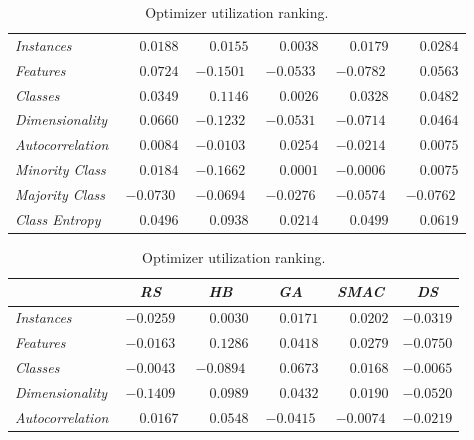 \begin{table}[ht]
\begin{subtable}{\textwidth}
\begin{tabular}{l|ccccc}
            \hline
            \textit{Instances} & $\phantom{-}0.0188$ & $\phantom{-}0.0155$ & $\phantom{-}0.0038$ & $\phantom{-}0.0179$ & $\phantom{-}0.0284$ \\
            \textit{Features} & $\phantom{-}0.0724$ & $-0.1501$ & $-0.0533$ & $-0.0782$ & $\phantom{-}0.0563$ \\
            \textit{Classes} & $\phantom{-}0.0349$ & $\phantom{-}0.1146$ & $\phantom{-}0.0026$ & $\phantom{-}0.0328$ & $\phantom{-}0.0482$ \\
            \textit{Dimensionality} & $\phantom{-}0.0660$ &$ -0.1232$ & $-0.0531$ & $-0.0714$ & $\phantom{-}0.0464$ \\
            \textit{Autocorrelation} & $\phantom{-}0.0084$ & $-0.0103$ & $\phantom{-}0.0254$ & $-0.0214$ & $\phantom{-}0.0075$ \\
            \textit{Minority Class} & $\phantom{-}0.0184$ & $-0.1662$ & $\phantom{-}0.0001$ & $-0.0006$ & $\phantom{-}0.0075$ \\
            \textit{Majority Class} & $-0.0730$ & $-0.0694$ & $-0.0276$ & $-0.0574$ & $-0.0762$ \\
            \textit{Class Entropy} & $\phantom{-}0.0496$ & $\phantom{-}0.0938$ & $\phantom{-}0.0214$ & $\phantom{-}0.0499$ & $\phantom{-}0.0619$ \\
            \hline
        \end{tabular}
    \end{subtable}
    \par\bigskip
    \begin{subtable}{\textwidth}
        \centering
        \caption{Optimizer utilization ranking.}
        \begin{tabular}{l|ccccc}
            & \textit{RS} & \textit{HB} & \textit{GA} & \textit{SMAC} & \textit{DS} \\
            \hline
            \textit{Instances} & $-0.0259$ & $\phantom{-}0.0030$ & $\phantom{-}0.0171$ & $\phantom{-}0.0202$ & $-0.0319$ \\
            \textit{Features} & $-0.0163$ & $\phantom{-}0.1286$ & $\phantom{-}0.0418$ & $\phantom{-}0.0279$ & $-0.0750$ \\
            \textit{Classes} & $-0.0043$ & $-0.0894$ & $\phantom{-}0.0673$ & $\phantom{-}0.0168$ & $-0.0065$ \\
            \textit{Dimensionality} & $-0.1409$ & $\phantom{-}0.0989$ & $\phantom{-}0.0432$ & $\phantom{-}0.0190$ & $-0.0520$ \\
            \textit{Autocorrelation} & $\phantom{-}0.0167$ & $\phantom{-}0.0548$ & $-0.0415$ & $-0.0074$ & $-0.0219$ \\

\end{tabular}
\end{subtable}
\end{table}
